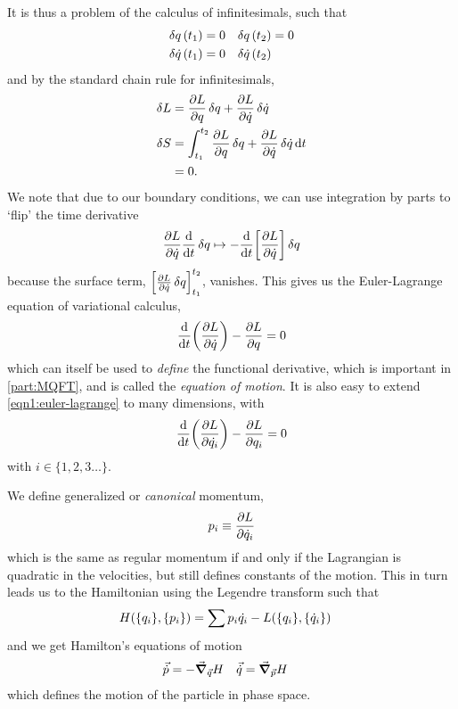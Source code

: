 \documentclass[notes.tex]{subfiles}
\begin{document}
It is thus a problem of the calculus of infinitesimals, such that
\begin{align*}
  \var{q}(t_1) &= 0 & \var{q}(t_2) &= 0 \\
  \var{\dot{q}}(t_1) &= 0 & \var{\dot{q}}(t_2)
\end{align*}
and by the standard chain rule for infinitesimals, 
\begin{align*}
  \var{L} &= \pdv{L}{q}\var{q} + \pdv{L}{\dot{q}}\var{\dot{q}}\\
  \var{S} &= \int_{t_1}^{t_2}\pdv{L}{q}\var{q} + \pdv{L}{\dot{q}}\var{\dot{q}} \dd{t}\\
  &= 0.
\end{align*}
We note that due to our boundary conditions, we can use integration by parts to `flip' the time derivative
\begin{equation*}
  \pdv{L}{\dot{q}}\dv{t} \var{q} \mapsto - \dv{t}\qty[\pdv{L}{\dot{q}}] \var{q}
\end{equation*}
because the surface term, $\qty[\pdv{L}{\dot{q}}\var{q}]_{t_1}^{t_2}$, vanishes. 
This gives us the Euler-Lagrange equation of variational calculus,
\begin{equation}
  \dv{t}(\pdv{L}{\dot{q}}) - \pdv{L}{q} = 0 \label{eqn1:euler-lagrange}
\end{equation}
which can itself be used to \emph{define} the functional derivative, which is important in \autoref{part:MQFT}, and is called the \emph{equation of motion}. 
It is also easy to extend \autoref{eqn1:euler-lagrange} to many dimensions, with 
\begin{equation*}
  \dv{t}(\pdv{L}{\dot{q_i}}) - \pdv{L}{q_i} = 0
\end{equation*}
with $i \in \{1, 2, 3 \ldots\}$.

We define generalized or \emph{canonical} momentum, \begin{equation*}
  p_i \equiv \pdv{L}{\dot{q}_i}
\end{equation*}
which is the same as regular momentum if and only if the Lagrangian is quadratic in the velocities, but still defines constants of the motion. 
This in turn leads us to the Hamiltonian using the Legendre transform such that
\begin{align*}
  H\qty(\qty{q_i}, \qty{p_i}) &= \sum p_i \dot{q_i} - L\qty(\qty{q_i}, \qty{\dot{q}_i})
\end{align*}
and we get Hamilton's equations of motion
\begin{align*}
  \vec{\dot{p}} &= -\grad_{\vec{q}} H & \vec{\dot{q}} &= \grad_{\vec{p}} H
\end{align*}
which defines the motion of the particle in phase space.
\end{document}
